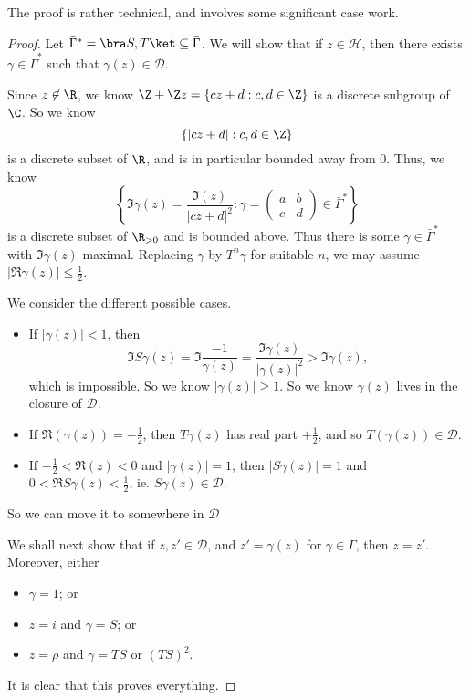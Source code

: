 \documentclass[a4paper]{article}
\renewcommand{\H}{\mathcal{H}}
\begin{document}
The proof is rather technical, and involves some significant case work.
\begin{proof}
  Let $\bar{\Gamma}^* = \bra S, T\ket \subseteq \bar{\Gamma}$. We will show that if $z \in \H$, then there exists $\gamma \in \bar\Gamma^*$ such that $\gamma(z) \in \mathcal{D}$.

  Since $z \not \in \R$, we know $\Z + \Z z = \{cz + d: c, d \in \Z\}$ is a discrete subgroup of $\C$. So we know
  \[
    \{|cz + d|: c, d \in \Z\}
  \]
  is a discrete subset of $\R$, and is in particular bounded away from $0$. Thus, we know
  \[
    \left\{\Im \gamma(z) = \frac{\Im (z)}{|cz + d|^2}: \gamma =
    \begin{pmatrix}
      a & b\\
      c & d
    \end{pmatrix} \in \bar\Gamma^*\right\}
  \]
  is a discrete subset of $\R_{>0}$ and is bounded above. Thus there is some $\gamma \in \bar{\Gamma}^*$ with $\Im \gamma(z)$ maximal. Replacing $\gamma$ by $T^n \gamma$ for suitable $n$, we may assume $|\Re \gamma(z)| \leq \frac{1}{2}$.

  We consider the different possible cases.
  \begin{itemize}
    \item If $|\gamma(z)| < 1$, then
      \[
        \Im S \gamma(z) = \Im \frac{-1}{\gamma(z)} = \frac{\Im \gamma(z)}{|\gamma(z)|^2} > \Im \gamma(z),
      \]
      which is impossible. So we know $|\gamma(z)| \geq 1$. So we know $\gamma(z)$ lives in the closure of $\mathcal{D}$.

    \item If $\Re(\gamma(z)) = -\frac{1}{2}$, then $T \gamma(z)$ has real part $+\frac{1}{2}$, and so $T(\gamma(z)) \in \mathcal{D}$.

    \item If $-\frac{1}{2} < \Re(z) < 0$ and $|\gamma(z)| = 1$, then $|S\gamma(z)| = 1$ and $0 < \Re S\gamma(z) < \frac{1}{2}$, ie. $S \gamma(z) \in \mathcal{D}$.
  \end{itemize}
  So we can move it to somewhere in $\mathcal{D}$

  \separator

  We shall next show that if $z, z' \in \mathcal{D}$, and $z' = \gamma(z)$ for $\gamma \in \bar{\Gamma}$, then $z = z'$. Moreover, either
  \begin{itemize}
    \item $\gamma = 1$; or
    \item $z = i$ and $\gamma = S$; or
    \item $z = \rho$ and $\gamma = TS$ or $(TS)^2$.
  \end{itemize}
  It is clear that this proves everything.


\end{proof}
\end{document}
